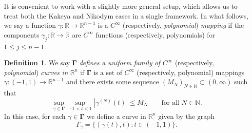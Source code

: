 \documentclass[reqno]{amsart}
\numberwithin{equation}{section}
\newcommand{\N}{\mathbb{N}}
\newcommand{\R}{\mathbb{R}}
\newcommand{\bdGamma}{\boldsymbol{\Gamma}}
\theoremstyle{plain}
\theoremstyle{definition}
\newtheorem{definition}[theorem]{Definition}
\begin{document}
It is convenient to work with a slightly more general setup, which allows us to treat both the Kakeya and Nikodym cases in a single framework. In what follows, we say a function $\gamma \colon \R \to \R^{n-1}$ is a \textit{$C^{\infty}$} (respectively, \textit{polynomial}) \textit{mapping} if the components $\gamma_j \colon \R \to \R$ are $C^\infty$ functions (respectively, polynomials) for $1 \leq j \leq n-1$.

\begin{definition} We say $\bdGamma$ \textit{defines a uniform family of $C^{\infty}$} (respectively, \textit{polynomial}) \textit{curves in $\R^n$} if $\bdGamma$ is a set of $C^{\infty}$ (respectively, polynomial) mappings $\gamma \colon (-1, 1) \to \R^{n-1}$ and there exists some sequence $(M_N)_{N \in \N} \subset (0,\infty)$ such that
\begin{equation}\label{eq: uniform family curves}
    \sup_{\gamma \in \bdGamma} \sup_{-1 < t < 1}|\gamma^{(N)}(t)| \leq M_N \qquad \textrm{for all $N \in \N$.}
\end{equation}
In this case, for each $\gamma \in \bdGamma$ we define a curve in $\R^n$ given by the graph
\begin{equation*}
    \Gamma_{\gamma} = \big\{(\gamma(t), t) : t \in (-1,1) \big\}.
\end{equation*}
\end{definition}
\end{document}
